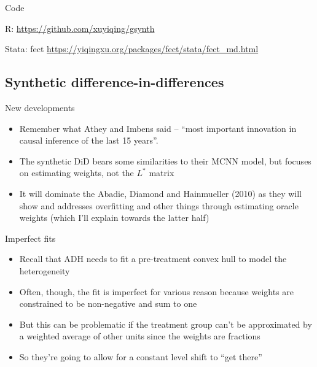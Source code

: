 \documentclass{beamer}
\begin{document}
\begin{frame}{Code}

R: \url{https://github.com/xuyiqing/gsynth}

\bigskip

Stata: fect \url{https://yiqingxu.org/packages/fect/stata/fect_md.html}

\end{frame}





\subsection{Synthetic difference-in-differences}

\begin{frame}{New developments}

\begin{itemize}
\item Remember what Athey and Imbens said -- ``most important innovation in causal inference of the last 15 years''.
\item The synthetic DiD bears some similarities to their MCNN model, but focuses on estimating weights, not the $L^*$ matrix
\item It will dominate the Abadie, Diamond and Hainmueller (2010) as they will show and addresses overfitting and other things through estimating oracle weights (which I'll explain towards the latter half)
\end{itemize}

\end{frame}





\begin{frame}{Imperfect fits}

\begin{itemize}
\item Recall that ADH needs to fit a pre-treatment convex hull to model the heterogeneity
\item Often, though, the fit is imperfect for various reason because weights are constrained to be non-negative and sum to one
\item But this can be problematic if the treatment group can't be approximated by a weighted average of other units since the weights are fractions 
\item So they're going to allow for a constant level shift to ``get there''
\end{itemize}

\end{frame}
\end{document}

